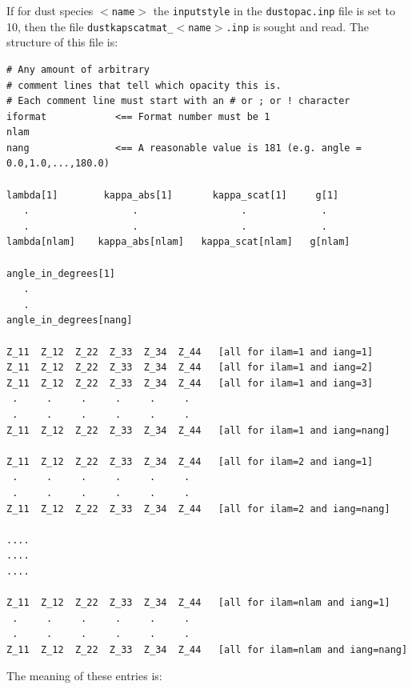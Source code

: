 \documentclass{report}
\newenvironment{asciibox}%
  {\begin{list}{}{%
    \setlength{\topsep}{0.5em}%
    \setlength{\parskip}{0em}%
    \setlength{\parsep}{0em}%
    \setlength{\itemsep}{0em}%
    \setlength{\rightmargin}{0em}%
    \setlength{\leftmargin}{3.0em}%
    \setlength{\labelsep}{1em}%
    \setlength{\labelwidth}{2em}%
  }\normalfont\footnotesize\item}
  {\end{list}}
\begin{document}
If for dust species {\small\tt $<$name$>$} the {\small\tt inputstyle} in the 
{\small\tt dustopac.inp} file is set to 10, then the file 
{\small\tt dustkapscatmat\_$<$name$>$.inp}
is sought and read. The structure of this file is:
\begin{asciibox}\begin{verbatim}
# Any amount of arbitrary
# comment lines that tell which opacity this is.
# Each comment line must start with an # or ; or ! character
iformat            <== Format number must be 1
nlam
nang               <== A reasonable value is 181 (e.g. angle = 0.0,1.0,...,180.0)

lambda[1]        kappa_abs[1]       kappa_scat[1]     g[1]
   .                  .                  .             .
   .                  .                  .             .
lambda[nlam]    kappa_abs[nlam]   kappa_scat[nlam]   g[nlam]

angle_in_degrees[1]
   .
   .
angle_in_degrees[nang]

Z_11  Z_12  Z_22  Z_33  Z_34  Z_44   [all for ilam=1 and iang=1]
Z_11  Z_12  Z_22  Z_33  Z_34  Z_44   [all for ilam=1 and iang=2]
Z_11  Z_12  Z_22  Z_33  Z_34  Z_44   [all for ilam=1 and iang=3]
 .     .     .     .     .     .
 .     .     .     .     .     .
Z_11  Z_12  Z_22  Z_33  Z_34  Z_44   [all for ilam=1 and iang=nang]

Z_11  Z_12  Z_22  Z_33  Z_34  Z_44   [all for ilam=2 and iang=1]
 .     .     .     .     .     .
 .     .     .     .     .     .
Z_11  Z_12  Z_22  Z_33  Z_34  Z_44   [all for ilam=2 and iang=nang]

....
....
....

Z_11  Z_12  Z_22  Z_33  Z_34  Z_44   [all for ilam=nlam and iang=1]
 .     .     .     .     .     .
 .     .     .     .     .     .
Z_11  Z_12  Z_22  Z_33  Z_34  Z_44   [all for ilam=nlam and iang=nang]
\end{verbatim}\end{asciibox}
The meaning of these entries is:
\end{document}
